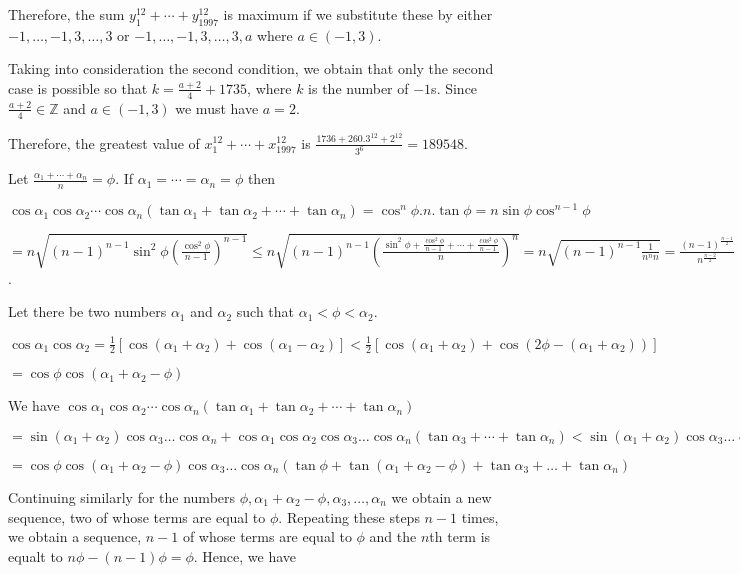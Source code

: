   Therefore, the sum $y_1^{12} + \cdots + y_{1997}^{12}$ is maximum if we substitute these by either $-1,
  \ldots, -1, 3,\ldots, 3$ or $-1, \ldots, -1, 3, \ldots, 3, a$ where $a\in(-1, 3)$.

  Taking into consideration the second condition, we obtain that only the second case is possible so that $k
  = \frac{a + 2}{4} + 1735$, where $k$ is the number of $-1$\symbol[rightquote]s. Since $\frac{a + 2}{4}\in\mathbb{Z}$
  and $a\in(-1, 3)$ we must have $a = 2$.

  Therefore, the greatest value of $x_1^{12} + \cdots + x_{1997}^{12}$ is $\frac{1736 + 260.3^{12} +
    2^{12}}{3^6} = 189548$.
\item Let $\frac{\alpha_1 + \cdots + \alpha_n}{n} = \phi$. If $\alpha_1 = \cdots = \alpha_n = \phi$ then

  $\cos\alpha_1\cos\alpha_2\cdots\cos\alpha_n(\tan\alpha_1 + \tan\alpha_2 + \cdots + \tan\alpha_n) =
  \cos^n\phi.n.\tan\phi = n\sin\phi\cos^{n - 1}\phi$

  $= n\sqrt{(n - 1)^{n - 1}\sin^2\phi\left(\frac{\cos^2\phi}{n - 1}\right)^{n - 1}}\leq n\sqrt{(n - 1)^{n -
      1}\left(\frac{\sin^2\phi + \frac{\cos^2\phi}{n - 1} + \cdots + \frac{\cos^2\phi}{n - 1}}{n}\right)^n} =
  n\sqrt{(n - 1)^{n - 1}\frac{1}{n^nn}} = \frac{(n - 1)^{\frac{n - 1}{2}}}{n^{\frac{n - 2}{2}}}$.

  Let there be two numbers $\alpha_1$ and $\alpha_2$ such that $\alpha_1 < \phi < \alpha_2$.

  $\cos\alpha_1\cos\alpha_2 = \frac{1}{2}[\cos(\alpha_1 + \alpha_2) + \cos(\alpha_1 - \alpha_2)] <
  \frac{1}{2}[\cos(\alpha_1 + \alpha_2) + \cos(2\phi - (\alpha_1 + \alpha_2))]$

  $=\cos\phi\cos(\alpha_1 + \alpha_2 - \phi)$

  We have $\cos\alpha_1\cos\alpha_2\cdots\cos\alpha_n(\tan\alpha_1 + \tan\alpha_2 + \cdots + \tan\alpha_n)$

  $= \sin(\alpha_1 + \alpha_2)\cos\alpha_3 \ldots \cos\alpha_n + \cos\alpha_1\cos\alpha_2\cos\alpha_3 \ldots
  \cos\alpha_n(\tan\alpha_3 + \cdots + \tan\alpha_n) < \sin(\alpha_1 + \alpha_2)\cos\alpha_3 \ldots
  \cos\alpha_n + \cos\phi\cos(\alpha_1 + \alpha_2 - \phi)\cos\alpha_3 \ldots \cos\alpha_n(\tan\alpha_3 +
  \cdots + \tan\alpha_n)$

  $=\cos\phi\cos(\alpha_1 + \alpha_2 - \phi)\cos\alpha_3\ldots\cos\alpha_n(\tan\phi + \tan(\alpha_1 +
  \alpha_2 - \phi)+ \tan\alpha_3 + \ldots + \tan\alpha_n)$

  Continuing similarly for the numbers $\phi, \alpha_1 + \alpha_2 - \phi, \alpha_3, \ldots, \alpha_n$ we
  obtain a new sequence, two of whose terms are equal to $\phi$. Repeating these steps $n - 1$ times, we
  obtain a sequence, $n - 1$ of whose terms are equal to $\phi$ and the $n$th term is equalt to $n\phi - (n
  - 1)\phi = \phi$. Hence, we have

